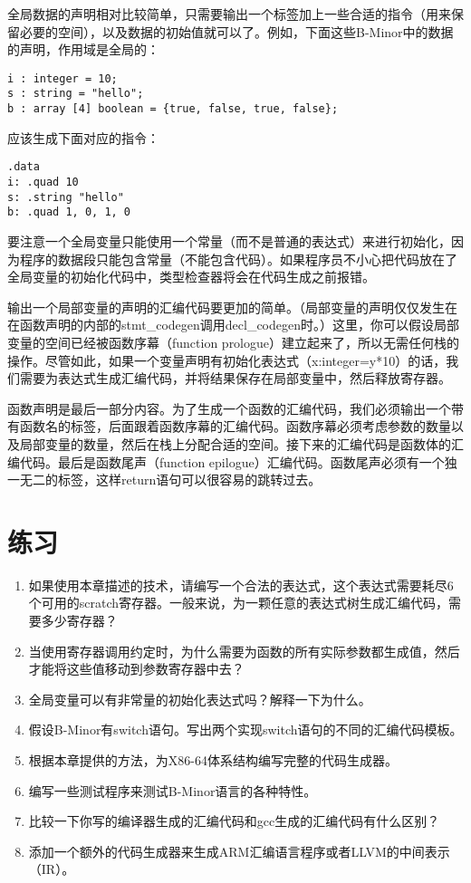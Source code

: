 \documentclass[cn,11pt,chinese]{elegantbook}
\begin{document}
全局数据的声明相对比较简单，只需要输出一个标签加上一些合适的指令（用来保留必要的空间），以及数据的初始值就可以了。例如，下面这些B-Minor中的数据的声明，作用域是全局的：

\begin{verbatim}
i : integer = 10;
s : string = "hello";
b : array [4] boolean = {true, false, true, false};
\end{verbatim}

应该生成下面对应的指令：

\begin{verbatim}
.data
i: .quad 10
s: .string "hello"
b: .quad 1, 0, 1, 0
\end{verbatim}

要注意一个全局变量只能使用一个常量（而不是普通的表达式）来进行初始化，因为程序的数据段只能包含常量（不能包含代码）。如果程序员不小心把代码放在了全局变量的初始化代码中，类型检查器将会在代码生成之前报错。

输出一个局部变量的声明的汇编代码要更加的简单。（局部变量的声明仅仅发生在在函数声明的内部的stmt\_codegen调用decl\_codegen时。）这里，你可以假设局部变量的空间已经被函数序幕（function prologue）建立起来了，所以无需任何栈的操作。尽管如此，如果一个变量声明有初始化表达式（x:integer=y*10）的话，我们需要为表达式生成汇编代码，并将结果保存在局部变量中，然后释放寄存器。

函数声明是最后一部分内容。为了生成一个函数的汇编代码，我们必须输出一个带有函数名的标签，后面跟着函数序幕的汇编代码。函数序幕必须考虑参数的数量以及局部变量的数量，然后在栈上分配合适的空间。接下来的汇编代码是函数体的汇编代码。最后是函数尾声（function epilogue）汇编代码。函数尾声必须有一个独一无二的标签，这样return语句可以很容易的跳转过去。

\section{练习}

\begin{enumerate}
  \item 如果使用本章描述的技术，请编写一个合法的表达式，这个表达式需要耗尽6个可用的scratch寄存器。一般来说，为一颗任意的表达式树生成汇编代码，需要多少寄存器？
  \item 当使用寄存器调用约定时，为什么需要为函数的所有实际参数都生成值，然后才能将这些值移动到参数寄存器中去？
  \item 全局变量可以有非常量的初始化表达式吗？解释一下为什么。
  \item 假设B-Minor有switch语句。写出两个实现switch语句的不同的汇编代码模板。
  \item 根据本章提供的方法，为X86-64体系结构编写完整的代码生成器。
  \item 编写一些测试程序来测试B-Minor语言的各种特性。
  \item 比较一下你写的编译器生成的汇编代码和gcc生成的汇编代码有什么区别？
  \item 添加一个额外的代码生成器来生成ARM汇编语言程序或者LLVM的中间表示（IR）。
\end{enumerate}
\end{document}
